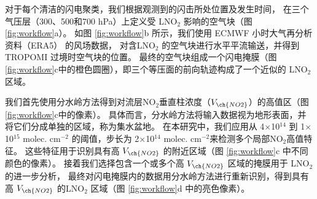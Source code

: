 对于每个清洁的闪电聚类，我们根据观测到的闪击所处位置及发生时间，
在三个气压层（300、500和700 hPa）上定义受 LNO$_2$ 影响的空气块（图 \ref{fig:workflow}a）。
如图 \ref{fig:workflow}b 所示，我们使用 ECMWF 小时大气再分析资料（ERA5） 的风场数据\citep{Hersbach.2020}，
对含LNO$_2$ 的空气块进行水平平流输送，并得到TROPOMI 过境时空气块的位置。
最终的空气块组成一个闪电掩膜（图 \ref{fig:workflow}c中的橙色圆圈），即三个等压面的前向轨迹构成了一个近似的 LNO$_2$ 区域。

我们首先使用分水岭方法得到对流层NO$_2$垂直柱浓度（$V_{\ch{NO2}}$）的高值区（图 \ref{fig:workflow}c中的像素）。
具体而言，分水岭方法将输入数据视为地形表面，并将它们分成单独的区域，称为集水盆地\citep{Soille.1990,Heikenfeld.2019a}。
在本研究中，我们应用从 4$\times$10$^{14}$ 到 1$\times$10$^{15}$ molec. cm$^{-2}$ 的阈值，步长为 2$\times$10$^{14}$ molec. cm$^{-2}$来检测多个局部NO$_2$高值特征。
这些特征用于识别具有高 $V_{\ch{NO2}}$ 的附近区域（图 \ref{fig:workflow}c 中不同颜色的像素）。
接着我们选择包含一个或多个高 $V_{\ch{NO2}}$ 区域的掩膜用于 LNO$_2$ 的进一步分析，
最终对闪电掩膜内的数据用分水岭方法进行重新识别，得到具有高 $V_{\ch{NO2}}$ 的LNO$_2$ 区域（图 \ref{fig:workflow}d 中的亮色像素）。


